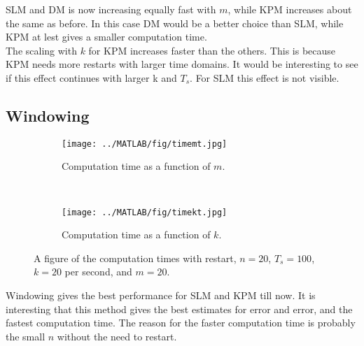 SLM and DM is now increasing equally fast with $m$, while KPM increases about the same as before. In this case DM would be a better choice than SLM, while KPM at lest gives a smaller computation time. \\
The scaling with $k$ for KPM increases faster than the others. This is because KPM needs more restarts with larger time domains. It would be interesting to see if this effect continues with larger k and $ T_s $. For SLM this effect is not visible. \\
\subsection{Windowing}
\begin{figure}[H]
        \centering
        \begin{subfigure}[b]{0.45\textwidth}
                \texttt{[image: ../MATLAB/fig/timemt.jpg]}
                \caption{ Computation time as a function of $m$. }
                \label{fig:timemt}
        \end{subfigure}
        ~
        \begin{subfigure}[b]{0.45\textwidth}
                \texttt{[image: ../MATLAB/fig/timekt.jpg]}
                \caption{ Computation time as a function of $k$. }
                \label{fig:timekt}
        \end{subfigure}
        \caption{ A figure of the computation times with restart, $n = 20$, $T_s = 100$, $k = 20$ per second, and $m = 20$. }
        \label{fig:time2}
\end{figure}
Windowing gives the best performance for SLM and KPM till now. It is interesting that this method gives the best estimates for error and error, and the fastest computation time. The reason for the faster computation time is probably the small $n$ without the need to restart. 
